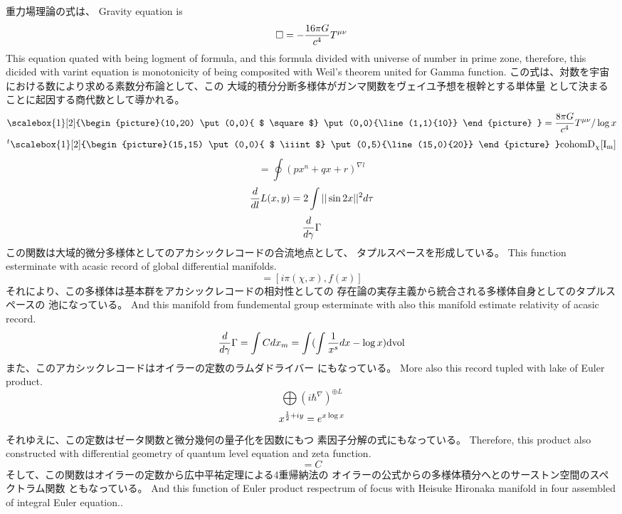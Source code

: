 \documentclass{jsarticle}
\begin{document}
{   \newcommand{\variint}{%
	\begin{picture}(15,30)
		\put(0,0){
			$ \iint $}
		\put(0,5){\line(15,0){15}}
	\end{picture} %
}

\newcommand{\variiint}{%
	\begin{picture}(15,15)
		\put(0,0){
			$ \iiint $}
		\put(0,5){\line(15,0){20}}
	\end{picture} %
}



 \newcommand{\alearletter}{%
	 \begin{picture}(10,20)
		 \put(0,0){
			 $ \square $}
		 \put(0,0){\line(1,1){10}}
	 \end{picture} %
	 }

 重力場理論の式は、
  Gravity equation is
  $$ \square = - {16 \pi G \over c^4}T^{\mu\nu} $$
  This equation quated with being logment of formula, and
  this formula divided with universe of number in prime zone,
  therefore, this dicided with varint equation is monotonicity of
  being composited with Weil's theorem united for Gamma function.
  この式は、対数を宇宙における数により求める素数分布論として、この
  大域的積分分断多様体がガンマ関数をヴェイユ予想を根幹とする単体量
  として決まることに起因する商代数として導かれる。
  $$ \scalebox{1}[2]{\alearletter} = 
  {{{{8 \pi G} \over {c^4}}T^{\mu\nu}}/ \log x} $$
  $$ {}^{t}\scalebox{1}[2]{\variiint}\mathrm{cohom D_{\chi}[I_m]}$$
  $$ = \oint {(px^n + qx + r)^{\nabla l}} $$
  $$ {d \over d l}L(x,y) = 2 \int ||\sin 2x||^{2}d \tau $$
  $$ {d \over d \gamma}\Gamma $$
  この関数は大域的微分多様体としてのアカシックレコードの合流地点として、
  タプルスペースを形成している。
  This function esterminate with acasic record of global differential
  manifolds.
  $$ = [i \pi (\chi, x), f(x)] $$
  それにより、この多様体は基本群をアカシックレコードの相対性としての
  存在論の実存主義から統合される多様体自身としてのタプルスペースの
  池になっている。
  And this manifold from fundemental group esterminate with
  also this manifold estimate relativity of acasic record.
  $$ {d \over d \gamma}\Gamma = \int C dx_m = \int(\int {1 \over x^s}dx
  - \log x)\mathrm{dvol} $$
  また、このアカシックレコードはオイラーの定数のラムダドライバー
  にもなっている。
  More also this record tupled with lake of Euler product.
  $$ \bigoplus({i \hbar^{\nabla}})^{\oplus L} $$
  $$ x^{{1 \over 2} + iy} = e^{x \log x} $$
  それゆえに、この定数はゼータ関数と微分幾何の量子化を因数にもつ
  素因子分解の式にもなっている。
  Therefore, this product also constructed with differential geometry
  of quantum level equation and zeta function.
  $$ = C $$ 
  そして、この関数はオイラーの定数から広中平祐定理による4重帰納法の
  オイラーの公式からの多様体積分へとのサーストン空間のスペクトラム関数
  ともなっている。
  And this function of Euler product respectrum of focus with
  Heisuke Hironaka manifold in four assembled of integral Euler equation.. 

}
\end{document}
